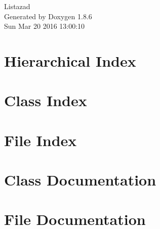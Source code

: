 \documentclass[twoside]{book}
\newcommand{\clearemptydoublepage}{%
  \newpage{\pagestyle{empty}\cleardoublepage}%
}
\begin{document}
\hypersetup{pageanchor=false}
\begin{titlepage}
\vspace*{7cm}
\begin{center}%
{\Large Listazad }\\
\vspace*{1cm}
{\large Generated by Doxygen 1.8.6}\\
\vspace*{0.5cm}
{\small Sun Mar 20 2016 13:00:10}\\
\end{center}
\end{titlepage}
\clearemptydoublepage
\tableofcontents
\clearemptydoublepage
{}
\hypersetup{pageanchor=true}

\chapter{Hierarchical Index}

\chapter{Class Index}

\chapter{File Index}

\chapter{Class Documentation}









\chapter{File Documentation}



















\newpage
{}
{}
\printindex
\end{document}
